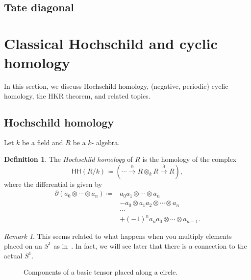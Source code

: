 \documentclass[10pt]{amsart}
\theoremstyle{definition}
\newtheorem{defn}[thm]{Definition}
\theoremstyle{remark}
\newtheorem{rmk}[thm]{Remark}
\theoremstyle{plain}
\theoremstyle{definition}
\theoremstyle{remark}
\newcommand{\ms}[1]{\mathsf{#1}}
\newcommand{\1}{\mathbf{1}}
\newcommand{\2}{\mathbf{2}}
\newcommand{\3}{\mathbf{3}}
\newcommand{\HH}{\ms{HH}}
\begin{document}
\subsection{Tate diagonal}%
\label{sub:Tate diagonal}




\section{Classical Hochschild and cyclic homology}%
\label{sec:Classical Hochschild and cyclic homology}

In this section, we discuss Hochschild homology, (negative, periodic) cyclic homology, the HKR theorem, and related topics.

\subsection{Hochschild homology}%
\label{sub:Hochschild homology}

Let \(k\) be a field and \(R\) be a \(k\)- algebra.

\begin{defn}
    The \textit{Hochschild homology} of \(R\) is the homology of the complex
    \[
        \HH(R/k) \coloneqq (\cdots \xrightarrow{\partial} R \otimes_k R \xrightarrow{\partial} R),
    \]
    where the differential is given by
    \begin{align*}
        \partial(a_0 \otimes \cdots \otimes a_n) \coloneqq{} & a_0 a_1 \otimes \cdots \otimes a_n \\
        &- a_0 \otimes a_1 a_2 \otimes \cdots \otimes a_n \\
        & \cdots \\
        &+ (-1)^n a_n a_0 \otimes \cdots \otimes a_{n-1}.
    \end{align*}
\end{defn}

\begin{rmk}
    This seems related to what happens when you multiply elements placed on an \(S^1\) as in~. In fact, we will see later that there is a connection to the actual \(S^1\).
    \begin{figure}[htpb]
    \begin{center}
    \end{center}
    \caption{Components of a basic tensor placed along a circle.}%
    \label{fig:hhcircle}
    \end{figure}
\end{rmk}
\end{document}
